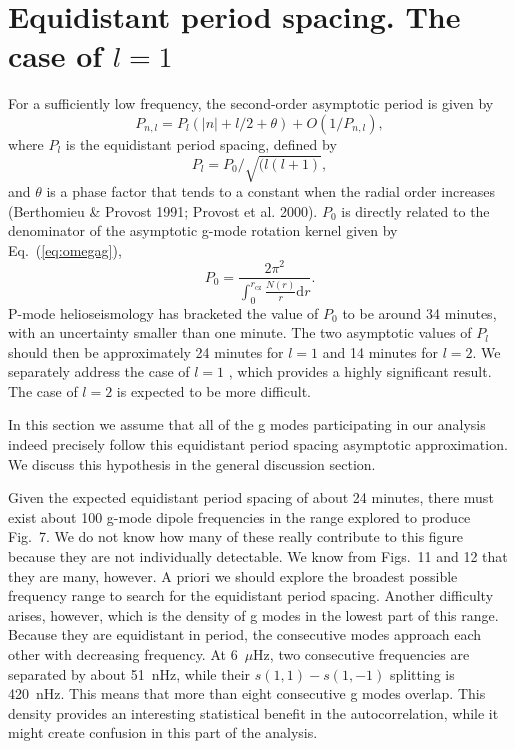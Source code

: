 \documentclass[bibyear]{aa}
\begin{document}
\section{Equidistant period spacing. The case of $l=1$}

 For a sufficiently low frequency, the second-order asymptotic period  
is given by
\begin{equation}\label{eq:2ndasymptotic}
P_{n,l}=P_{l}(|n|+l/2+\theta )+O(1/P_{n,l})
,\end{equation}  
where $P_{l}$  is the equidistant period spacing, defined by
\begin{equation}\label{eq:Pl}
P_l=P_0/\sqrt{(l(l+1)}
,\end{equation}
and $\theta$ is a phase factor that tends to a constant when the radial order increases (Berthomieu \& Provost 1991; Provost et al. 2000).
$P_0$ is directly related to the denominator of 
the asymptotic g-mode rotation kernel given by Eq.~(\ref{eq:omegag}), 
\begin{equation}\label{eq:P0}
P_0=\frac{2\pi^2}{\int_0^{r_\mathrm{cz}}{\frac{N(r)}{r}\mathrm{d} r}}.
\end{equation}
%
P-mode helioseismology has bracketed the value of $P_{0}$  to be around 34 minutes, with an uncertainty smaller than one minute. The two asymptotic values of $P_{l}$ should then be approximately 24 minutes for $l=1$ and 14 minutes for $l=2$.  We separately
address  the case of  $l=1$ , which provides a highly significant result. The case of  $l=2$ is expected to be more difficult.
 
 In this section we assume that all of the g modes participating in our analysis indeed precisely follow this equidistant period spacing asymptotic approximation. We discuss this hypothesis in the general discussion section.

Given the expected equidistant period spacing of about 24 minutes, there must exist about 100 g-mode dipole frequencies in the range explored to produce Fig.~7. We do not know how many of these really contribute to this figure because they are not individually detectable.  We know from Figs.~11 and 12 that they are many,
however. A priori we should explore the broadest possible frequency range to search for the equidistant period spacing. Another difficulty arises, however, which is the density of g modes in the lowest part of this range. Because they are equidistant in period, the consecutive modes approach each other with decreasing frequency. At  6~$\mu$Hz, two consecutive frequencies are separated by about 51~nHz, while their $s(1,1)-s(1,-1)$ splitting is  420~nHz. This means that more than eight consecutive g modes overlap.  This density provides an interesting statistical benefit in the autocorrelation, while it might create confusion in this part of the analysis. 
\end{document}
